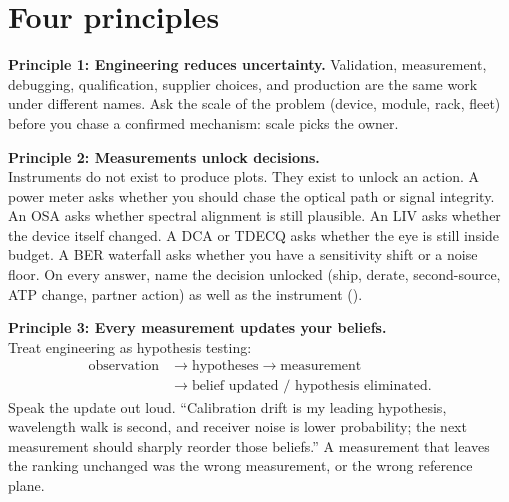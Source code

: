 
\section{Four principles}
\label{sec:interview-philosophy}

\noindent\textbf{Principle 1: Engineering reduces uncertainty.}
Validation, measurement, debugging, qualification, supplier choices, and
production are the same work under different names. Ask the scale of the
problem (device, module, rack, fleet) before you chase a confirmed mechanism: scale
picks the owner.

\noindent\textbf{Principle 2: Measurements unlock decisions.}\\
Instruments do not exist to produce plots. They exist to unlock an action.
A power meter asks whether you should chase the optical path or signal
integrity. An OSA asks whether spectral alignment is still plausible. An LIV
asks whether the device itself changed. A DCA or
TDECQ asks whether the eye is still inside budget. A BER
waterfall asks whether you have a sensitivity shift or a noise floor. On every
answer, name the decision unlocked (ship, derate, second-source,
ATP change, partner action) as well as the instrument
().

\noindent\textbf{Principle 3: Every measurement updates your beliefs.}\\
Treat engineering as hypothesis testing:
\[
\begin{split}
\text{observation} &\longrightarrow \text{hypotheses}
\longrightarrow \text{measurement}\\
&\longrightarrow \text{belief updated / hypothesis eliminated}.
\end{split}
\]
Speak the update out loud. ``Calibration drift is my leading hypothesis,
wavelength walk is second, and receiver noise is lower probability; the next
measurement should sharply reorder those beliefs.'' A measurement that leaves
the ranking unchanged was the wrong measurement, or the wrong reference plane.

